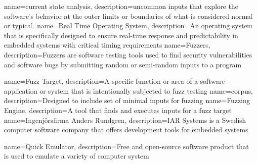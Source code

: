 {
	name=current state analysis,
	description={uncommon inputs that explore the
	software's behavior at the outer limits or boundaries of what is considered normal or typical.}
}
{
	name=Real Time Operating System,
	description={An operating system that is specifically designed to
	ensure real-time response and predictability in embedded systems
	with critical timing requirements}
}
{
	name=Fuzzers,
	description={Fuzzers are software testing tools used to find security
	vulnerabilities and software bugs by submitting random or
	semi-random inputs to a program}
}

{
	name=Fuzz Target,
	description={A specific function or area of a software application or
	system that is intentionally subjected to fuzz testing}
}
{
	name=corpus,
	description={Designed to include set of minimal inputs for fuzzing }
}
{
	name=Fuzzing Engine,
	description={A tool that finds and executes inputs for a fuzz target}
}
{
	name=Ingenjörsfirma Anders Rundgren,
	description={IAR Systems is a Swedish computer software company that
	offers development tools for embedded systems}
}

{
	name=Quick Emulator,
	description={Free and open-source software
	product that is used to emulate a
	variety of computer system}
}